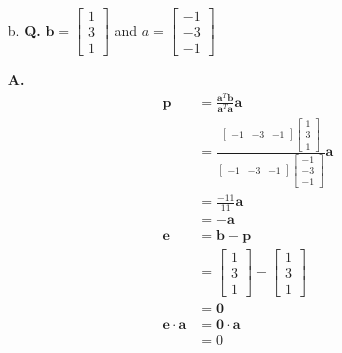\documentclass[main.tex]{subfiles}
\begin{document}
\begin{enumerate}
\begin{enumerate}
        \item [b.] \textbf{Q.} $\boldsymbol{b}=\left[\begin{array}{l}1 \\ 3 \\ 1\end{array}\right]$ and $a=\left[\begin{array}{l}-1 \\ -3 \\ -1\end{array}\right]$ 
        
        \textbf{A.}
        $$
        \begin{aligned}
        \bm{p}&=\frac{\bm{a}^{T} \bm{b}}{\bm{a}^{T} \bm{a}} \bm{a}\\
        &=\frac{\left[\begin{array}{lll}
        -1 & -3 & -1
        \end{array}\right]\left[\begin{array}{l}
        1 \\
        3 \\
        1
        \end{array}\right]}{\left[\begin{array}{lll}
        -1 & -3 & -1
        \end{array}\right]\left[\begin{array}{r}
        -1 \\
        -3 \\
        -1
        \end{array}\right]}\bm{a}\\
        &=\frac{-11}{11} \bm{a} \\
        &=-\bm{a}\\
        \bm{e} &= \bm{b} - \bm{p} \\
        &=\left[\begin{array}{l}
        1 \\
        3 \\
        1
        \end{array}\right]-\left[\begin{array}{l}
        1 \\
        3 \\
        1
        \end{array}\right] \\
        &=\bm{0}\\
        \bm{e} \cdot \bm{a} &=\bm{0} \cdot \bm{a} \\
        &=0
        \end{aligned}
        $$
    

\end{enumerate}
\end{enumerate}
\end{document}
